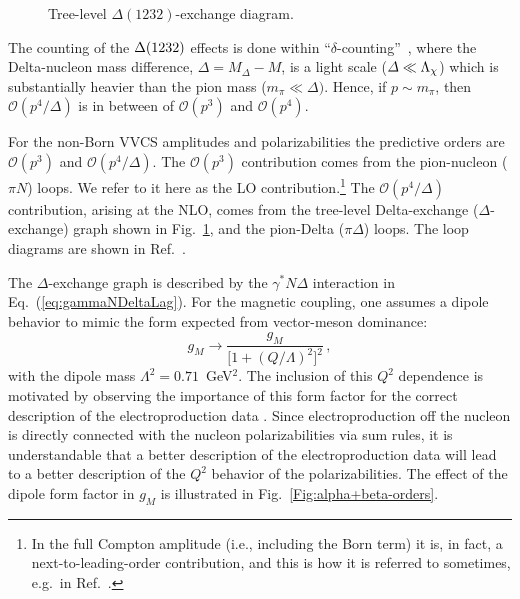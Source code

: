 \documentclass[12pt,preprint,tightenlines,
showpacs,preprintnumbers,amsmath,amssymb,
a4paper,nofootinbib]{revtex4-1}
\def\Eqref#1{Eq.~(\ref{eq:#1})}
\begin{document}
\begin{figure}[tbh]
\centering
{}
\caption{Tree-level $\Delta(1232)$-exchange diagram. \label{DeltaExchange}}
\end{figure}

The counting of the $\Delta(1232)$ effects is done within  ``$\delta$-counting''~\cite{Pascalutsa:2003aa}, where the Delta-nucleon mass difference,
$\varDelta=M_\Delta-M$, is a light scale ($\varDelta \ll {\Lambda}_\chi$) which is
substantially heavier than the pion mass ($m_\pi\ll\varDelta)$. Hence, if $p\sim m_\pi$, 
then $\mathcal{O}(p^4/\varDelta)$ is in between of $\mathcal{O}(p^3)$ and $\mathcal{O}(p^4)$. 


For the non-Born VVCS amplitudes
and polarizabilities the predictive orders are $\mathcal{O}(p^3)$ and $\mathcal{O}(p^4/\varDelta)$.
The $\mathcal{O}(p^3)$ contribution comes from the pion-nucleon ($\pi N$) loops.
We refer to it here as the LO contribution.\footnote{In the full Compton amplitude (i.e., 
including the Born term) it is, in fact, a next-to-leading-order contribution, and this is how it is referred to sometimes, e.g.~in Ref.~\cite{Lensky:2009uv}. }
The $\mathcal{O}(p^4/\varDelta)$ contribution, arising at the NLO, 
comes from the tree-level Delta-exchange ($\Delta$-exchange) graph shown in  Fig.~\ref{DeltaExchange}, and the pion-Delta ($\pi \Delta$) loops. The loop diagrams are shown in Ref.~\cite[Figs.~1 and 2]{Lensky:2014dda}.

The $\Delta$-exchange graph is described by the $\gamma^* N \Delta$ interaction in \Eqref{gammaNDeltaLag}. For the magnetic coupling, one assumes a dipole behavior to mimic the form expected from 
vector-meson dominance:
\begin{equation}
g_M\to \frac{g_M}{\big[1+\left(Q/\Lambda\right)^2\big]^2}\,,
\end{equation}
with the dipole mass $\Lambda^2=0.71$~GeV${^2}$. The inclusion of this $Q^2$ dependence is motivated by observing the importance of this form factor for the correct description of the electroproduction data \cite{Pascalutsa:2005vq}. Since electroproduction off the nucleon is directly connected with the nucleon polarizabilities via sum rules, it is understandable that a better description of the electroproduction data will lead to a better description of the $Q^2$ behavior of the polarizabilities. The effect of the dipole form factor in $g_M$ is illustrated in Fig.~\ref{Fig:alpha+beta-orders}.
\end{document}
